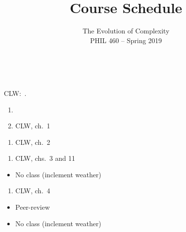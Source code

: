 \documentclass{article}
\author{\large The Evolution of Complexity\\ \normalsize PHIL 460 -- Spring 2019}
\date{}
\title{\bf Course Schedule\vspace{-0.5em}}
\begin{document}
\maketitle
\onehalfspacing{}





\ \newline{}

\noindent CLW:\ .


\dia{}
\NR{}

\dia{}
\begin{enumerate}
\item {}
\item CLW, ch.~1
\end{enumerate}

\dia{}
\begin{enumerate}
\item CLW, ch.~2
\end{enumerate}

\dia{}
\begin{enumerate}
\item CLW, chs.~3 and 11
\end{enumerate}

\dia{}
\begin{itemize}
\item[ ] No class (inclement weather)
\end{itemize}

\dia{}
\begin{enumerate}
\item CLW, ch.~4
\end{enumerate}


\week{}
\dia{}
\begin{itemize}
\item[ ] Peer-review
\end{itemize}

\dia{}
\begin{itemize}
\item No class (inclement weather)
\end{itemize}
\end{document}
